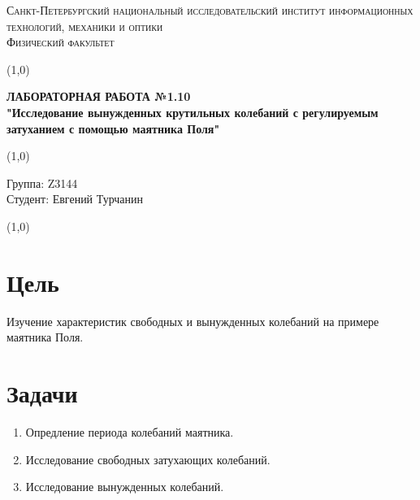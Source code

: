 \documentclass[a4paper]{article}
\date{}
\begin{document}
\begin{center}
\textsc{Санкт-Петербургский национальный исследовательский институт информационных технологий, механики и оптики\\[3mm]
Физический факультет} \\[3mm]

\end{center}
\vspace{5mm}
\line(1,0){\textwidth}
\begin{center}
\textbf{ЛАБОРАТОРНАЯ РАБОТА №1.10\\}
\textbf{"Исследование вынужденных
крутильных колебаний с регулируемым
затуханием с помощью маятника Поля"}
\end{center}
\vspace{2mm}
\line(1,0){\textwidth}
\vspace{5mm}
\begin{minipage}{0.4\textwidth}
    Группа: Z3144 \\
    Студент: Евгений Турчанин\\
    \vspace{1mm}
\end{minipage}
\hfill
\vspace{1mm}
\line(1,0){\textwidth}



\section{\textbf{Цель}}

Изучение характеристик свободных и вынужденных колебаний на примере маятника Поля.

\section{\textbf{Задачи}}

\begin{enumerate}
	\item Опредление периода колебаний маятника.
	\item Исследование свободных затухающих колебаний.
	\item Исследование вынужденных колебаний.
\end{enumerate}
\end{document}
